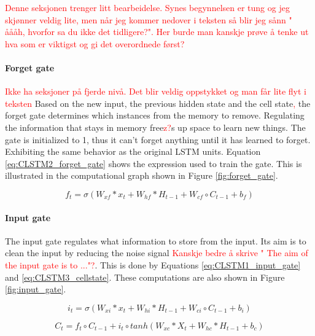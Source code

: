 \documentclass{article}
\begin{document}
\textcolor{red}{Denne seksjonen trenger litt bearbeidelse. Synes begynnelsen er tung og jeg skjønner veldig lite, men når jeg kommer nedover i teksten så blir jeg sånn " åååh, hvorfor sa du ikke det tidligere?". Her burde man kanskje prøve å tenke ut hva som er viktigst og gi det overordnede først?}

\paragraph{Forget gate} \label{sec:forget_gate}
\textcolor{red}{Ikke ha seksjoner på fjerde nivå. Det blir veldig oppstykket og man får lite flyt i teksten}
Based on the new input, the previous hidden state and the cell state\textcolor{red}{,} the forget gate determines which instances from the memory to remove. Regulating the information that stays in memory free\textcolor{red}{z?}s up space to learn new things. The gate is initialized to 1, thus it can't forget anything until it has learned to forget. Exhibiting the same behavior as the original LSTM units. Equation \eqref{eq:CLSTM2_forget_gate} shows the expression used to train the gate. This is illustrated in the computational graph shown in Figure \ref{fig:forget_gate}.

\begin{equation} \label{eq:CLSTM2_forget_gate}
        f_t = \sigma \left( W_{xf}*x_t + W_{hf}*H_{t-1} + W_{cf}\circ C_{t-1}+b_f \right) 
\end{equation}

\paragraph{Input gate}  \label{sec:input_gate}
The input gate regulates what information to store from the input. Its aim is to clean the input by reducing the noise signal \textcolor{red}{Kanskje bedre å skrive " The aim of the input gate is to ..."?}. This is done by Equations \eqref{eq:CLSTM1_input_gate} and \eqref{eq:CLSTM3_cellstate}. These computations are also shown in Figure \ref{fig:input_gate}.

\begin{equation} \label{eq:CLSTM1_input_gate}
    i_t = \sigma \left( W_{xi}*x_t + W_{hi}*H_{t-1} + W_{ci}\circ C_{t-1}+b_i \right) 
\end{equation}

\begin{equation} \label{eq:CLSTM3_cellstate}
        C_t = f_t \circ C_{t-1} +i_t\circ tanh\left( W_{xc}*X_t + W_{hc}*H_{t-1} + b_c \right)
\end{equation}
\end{document}
